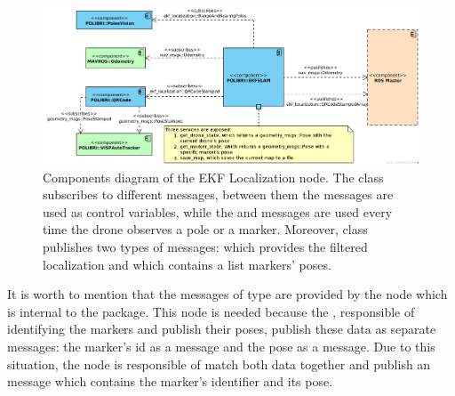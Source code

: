 \begin{figure}[h]
    \centering
    \includegraphics[width=\textwidth]{Figures/fig9-components_diagram}
    \caption[Components diagram of the EKF Localization node]{Components diagram of the EKF Localization node. The  class subscribes to different messages, between them the  messages are used as control variables, while the  and  messages are used every time the drone observes a pole or a marker. Moreover,  class publishes two types of messages:  which provides the filtered localization and  which contains a list markers' poses.}
    \label{fig:chapter2:architecture:components}
\end{figure}

It is worth to mention that the messages of type  are provided by the  node which is internal to the  package. This node is needed because the , responsible of identifying the markers and publish their poses, publish these data as separate messages: the marker's id as a  message and the pose as a  message. Due to this situation, the  node is responsible of match both data together and publish an  message which contains the marker's identifier and its pose.

